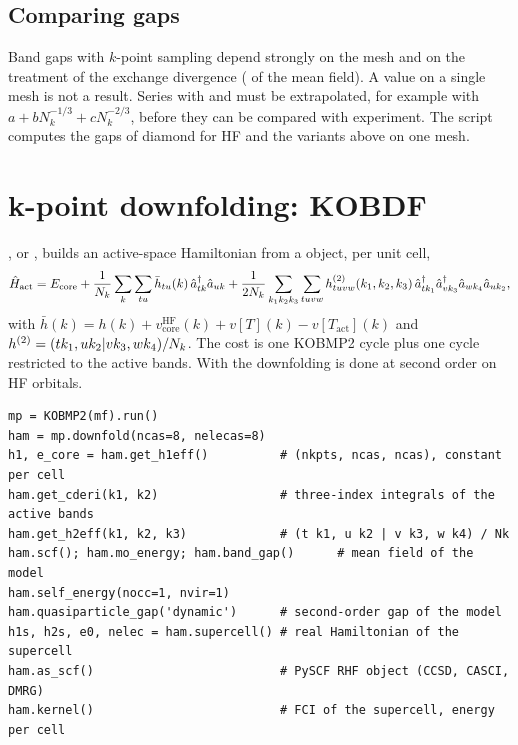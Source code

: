 \subsection{Comparing gaps}

Band gaps with $k$-point sampling depend strongly on the mesh and on the
treatment of the exchange divergence ( of the mean field). A
value on a single mesh is not a result. Series with  and
 must be extrapolated, for example with
$a + bN_k^{-1/3} + cN_k^{-2/3}$, before they can be compared with experiment.
The script  computes the gaps of diamond for
HF and the variants above on one mesh.

\section{k-point downfolding: KOBDF}
\label{sec:kobdf}

, or , builds an active-space Hamiltonian from a  object,
per unit cell,
\begin{equation}
  \hat H_{\mathrm{act}} = E_{\mathrm{core}}
  + \frac1{N_k}\sum_{k}\sum_{tu}\bar h_{tu}(k)\,\hat a^\dagger_{tk}\hat a_{uk}
  + \frac1{2N_k}\sum_{k_1k_2k_3}\sum_{tuvw}
  h^{(2)}_{tuvw}(k_1,k_2,k_3)\,
  \hat a^\dagger_{tk_1}\hat a^\dagger_{vk_3}\hat a_{wk_4}\hat a_{uk_2},
\end{equation}
with $\bar h(k)=h(k)+v^{\mathrm{HF}}_{\mathrm{core}}(k)+v[T](k)-v[T_{\mathrm{act}}](k)$
and $h^{(2)}=(tk_1,uk_2|vk_3,wk_4)/N_k$. The cost is one KOBMP2 cycle plus
one cycle restricted to the active bands. With
 the downfolding is done at
second order on HF orbitals.

\begin{lstlisting}[style=python]
mp = KOBMP2(mf).run()
ham = mp.downfold(ncas=8, nelecas=8)
h1, e_core = ham.get_h1eff()          # (nkpts, ncas, ncas), constant per cell
ham.get_cderi(k1, k2)                 # three-index integrals of the active bands
ham.get_h2eff(k1, k2, k3)             # (t k1, u k2 | v k3, w k4) / Nk
ham.scf(); ham.mo_energy; ham.band_gap()      # mean field of the model
ham.self_energy(nocc=1, nvir=1)
ham.quasiparticle_gap('dynamic')      # second-order gap of the model
h1s, h2s, e0, nelec = ham.supercell() # real Hamiltonian of the supercell
ham.as_scf()                          # PySCF RHF object (CCSD, CASCI, DMRG)
ham.kernel()                          # FCI of the supercell, energy per cell
\end{lstlisting}

